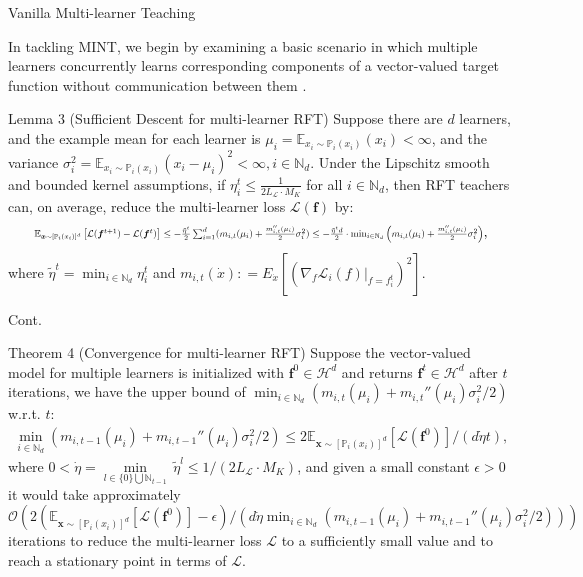 \documentclass[aspectratio=169,xcolor=dvipsnames]{beamer}
\begin{document}
\begin{frame}{Vanilla Multi-learner Teaching}

In tackling MINT, we begin by examining a basic scenario in which \alert{multiple} learners \alert{concurrently} learns corresponding components of a vector-valued target function \alert{without communication} between them \cite{kakade2012regularization,cesamultitask}.

\begin{block}{Lemma 3 (Sufficient Descent for multi-learner RFT)}
Suppose there are $d$ learners, and the example \alert{mean} for each learner is $\mu_i=\mathbb{E}_{x_i\sim\mathbb{P}_i(x_i)}(x_i)<\infty$, and the \alert{variance} $\sigma_i^2=\mathbb{E}_{x_i\sim\mathbb{P}_i(x_i)}(x_i-\mu_i)^2<\infty, i\in\mathbb{N}_d$. Under the \alert{Lipschitz smooth and bounded kernel assumptions}, if $\eta^t_i\leq \frac{1}{2L_\mathcal{L}\cdot M_K}$ for all $i\in\mathbb{N}_d$, then RFT teachers can, \alert{on average}, reduce the multi-learner loss $\mathcal{L}(\bm{f})$ by:
\begin{eqnarray}
\resizebox{.94\hsize}{!}{		$\mathbb{E}_{\bm{x}\sim[\mathbb{P}_i(x_i)]^d}\left[\mathcal{L}(\bm{f}^{t+1})-\mathcal{L}(\bm{f}^t)\right]\leq-\frac{\tilde{\eta}^t}{2}\sum_{i=1}^d (m_{i,t}(\mu_i)+\frac{m_{i,t}''(\mu_i)}{2}\sigma_i^2)\leq-\frac{\tilde{\eta}^t d}{2}\cdot\min_{i\in\mathbb{N}_d} \left(m_{i,t}(\mu_i)+\frac{m_{i,t}''(\mu_i)}{2}\sigma_i^2\right)$},
\end{eqnarray}
where $\tilde{\eta}^t=\min_{i\in\mathbb{N}_d}\eta^t_i$ and $m_{i,t}(\dot{x})\mathrel{\mathop:}= E_{\dot{x}}[(\left.\nabla_f\mathcal{L}_i(f)\right|_{f=f^{t}_i})^2]$.
\end{block}

\end{frame}

\begin{frame}{Cont.}
\begin{block}{Theorem 4 (Convergence for multi-learner RFT)}    
Suppose the \alert{vector-valued} model for multiple learners is initialized with $\bm{f}^0\in\mathcal{H}^d$ and returns $\bm{f}^t\in\mathcal{H}^d$ after $t$ iterations, we have the \alert{upper bound} of $\min_{i\in\mathbb{N}_d} \left(m_{i,t}(\mu_i)+m_{i,t}''(\mu_i)\sigma_i^2/2\right)$ w.r.t. $t$:
	\begin{eqnarray}\label{eqcpft}
		\min_{i\in\mathbb{N}_d} \left(m_{i,t-1}(\mu_i)+m_{i,t-1}''(\mu_i)\sigma_i^2/2\right)\leq2\mathbb{E}_{\bm{x}\sim[\mathbb{P}_i(x_i)]^d}\left[\mathcal{L}(\bm{f}^0)\right]/(d\dot{\eta}t),
	\end{eqnarray}
	where $0<\dot{\eta}=\underset{l\in\{0\}\bigcup\mathbb{N}_{t-1}}{\min}\,\tilde{\eta}^l\leq 1/(2L_\mathcal{L}\cdot M_K)$, and given a small constant $\epsilon>0$ it would take approximately $\mathcal{O}\left(2(\mathbb{E}_{\bm{x}\sim[\mathbb{P}_i(x_i)]^d}\left[\mathcal{L}(\bm{f}^0)\right]-\epsilon)/(d\dot{\eta}\min_{i\in\mathbb{N}_d} \left(m_{i,t-1}(\mu_i)+m_{i,t-1}''(\mu_i)\sigma_i^2/2\right))\right)$ iterations to reduce the \alert{multi-learner} loss $\mathcal{L}$ to a \alert{sufficiently small} value and to reach a \alert{stationary point} in terms of $\mathcal{L}$.
\end{block} 
\end{frame}
\end{document}
